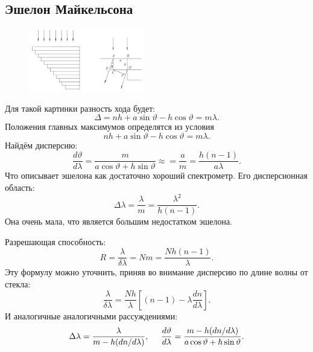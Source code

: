 \subsection{Эшелон Майкельсона}
\begin{figure}[h]
    \centering
    \includegraphics[width=0.45\textwidth]{figures/s47_1.png}
\end{figure}
Для такой картинки разность хода будет:
\begin{equation*}
	\Delta = n h + a \sin \vartheta - h \cos \vartheta = m \lambda.
\end{equation*}
Положения главных максимумов определятся из условия
\begin{equation*}
	nh + a \sin \vartheta - h \cos \vartheta = m \lambda.
\end{equation*}
Найдём дисперсию:
\begin{equation*}
	\frac{d \vartheta}{d \lambda} = \frac{m}{a \cos \vartheta + h \sin \vartheta} \approx = \frac{a}{m} = \frac{h (n-1)}{a \lambda}.
\end{equation*}
Что описывает эшелона как достаточно хороший спектрометр. Его дисперсионная область:
\begin{equation*}
	\Delta \lambda = \frac{\lambda}{m} = \frac{\lambda^2}{h (n-1)}.
\end{equation*}
Она очень мала, что является большим недостатком эшелона.

Разрешающая способность: 
\begin{equation*}
	R = \frac{\lambda}{\delta\lambda} = N m = \frac{N h (n-1)}{\lambda}.
\end{equation*}
Эту формулу можно уточнить, приняв во внимание дисперсию по длине волны от стекла:
\begin{equation*}
	\frac{\lambda}{\delta\lambda} = \frac{N h}{\lambda} \left[(n-1) - \lambda \frac{d n}{d \lambda}\right].
\end{equation*}
И аналогичные аналогичными рассуждениями:
\begin{equation*}
	\Delta\lambda = \frac{\lambda}{m - h (d n / d\lambda)},
	\hspace{0.5 cm}
	\frac{d \vartheta}{d \lambda} = \frac{m - h (d n/d \lambda)}{a \cos \vartheta + h \sin \vartheta}.
\end{equation*}	